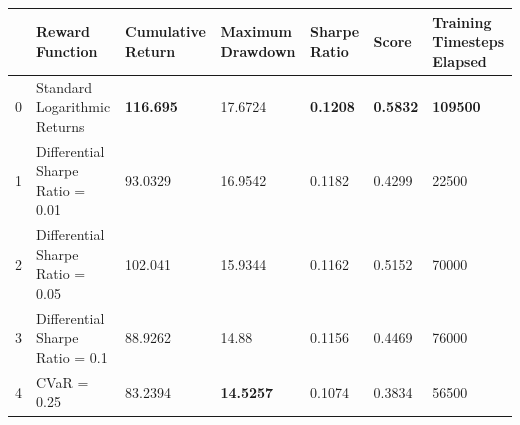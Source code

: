 \begin{tabular}{lllllll}
\toprule
 & Reward Function & Cumulative Return & Maximum Drawdown & Sharpe Ratio & Score & Training Timesteps Elapsed \\
\midrule
0 & Standard Logarithmic Returns & \textbf{116.695} & 17.6724 & \textbf{0.1208} & \textbf{0.5832} & \textbf{109500} \\
1 & Differential Sharpe Ratio = 0.01 & 93.0329 & 16.9542 & 0.1182 & 0.4299 & 22500 \\
2 & Differential Sharpe Ratio = 0.05 & 102.041 & 15.9344 & 0.1162 & 0.5152 & 70000 \\
3 & Differential Sharpe Ratio = 0.1 & 88.9262 & 14.88 & 0.1156 & 0.4469 & 76000 \\
4 & CVaR = 0.25 & 83.2394 & \textbf{14.5257} & 0.1074 & 0.3834 & 56500 \\
\bottomrule
\end{tabular}
